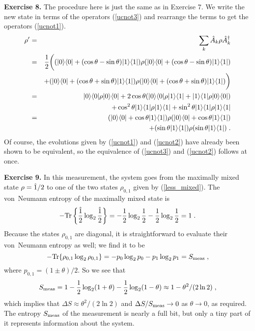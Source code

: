 {\bf Exercise 8.}  The procedure here is just the same as in Exercise 7.
We write the new state in terms of the operators (\ref{ucnot3}) and
rearrange the terms to get the operators (\ref{ucnot1}).
\begin{eqnarray}
\rho' &=& \sum_k {\hat A}_k \rho {\hat A^\dagger}_k \nonumber\\
&=& {1\over2}\biggl( ({| 0 \rangle}{\langle 0 |} + (\cos\theta-\sin\theta){| 1 \rangle}{\langle 1 |} )
  \rho ({| 0 \rangle}{\langle 0 |} + (\cos\theta-\sin\theta){| 1 \rangle}{\langle 1 |} ) \nonumber\\
&& + ({| 0 \rangle}{\langle 0 |} + (\cos\theta+\sin\theta){| 1 \rangle}{\langle 1 |} )\rho
  ({| 0 \rangle}{\langle 0 |} + (\cos\theta+\sin\theta){| 1 \rangle}{\langle 1 |}) \biggr) \nonumber\\
&=& {| 0 \rangle}{\langle 0 |}\rho{| 0 \rangle}{\langle 0 |} + 2\cos\theta({| 0 \rangle}{\langle 0 |}\rho{| 1 \rangle}{\langle 1 |}
  + {| 1 \rangle}{\langle 1 |}\rho{| 0 \rangle}{\langle 0 |} ) \nonumber\\
&& + \cos^2\theta {| 1 \rangle}{\langle 1 |}\rho{| 1 \rangle}{\langle 1 |}
  + \sin^2\theta {| 1 \rangle}{\langle 1 |}\rho{| 1 \rangle}{\langle 1 |} \nonumber\\
&=& ({| 0 \rangle}{\langle 0 |} + \cos\theta{| 1 \rangle}{\langle 1 |}) \rho
  ({| 0 \rangle}{\langle 0 |} + \cos\theta{| 1 \rangle}{\langle 1 |}) \nonumber\\
&& + (\sin\theta{| 1 \rangle}{\langle 1 |})\rho(\sin\theta{| 1 \rangle}{\langle 1 |}) \;. \nonumber
\end{eqnarray}
Of course, the evolutions given by (\ref{ucnot1}) and (\ref{ucnot2})
have already been shown to be equivalent, so the equivalence of
(\ref{ucnot3}) and (\ref{ucnot2}) follows at once.

{\bf Exercise 9.}  In this measurement, the system goes from the maximally
mixed state $\rho = {\hat 1}/2$ to one of the two states $\rho_{0,1}$ given
by (\ref{less_mixed}).  The von~Neumann entropy of the maximally mixed
state is
\[
-{\rm Tr}\left\{ {{\hat 1}\over2}\log_2{{\hat 1}\over2} \right\} =
  - {1\over2}\log_2{1\over2} - {1\over2}\log_2{1\over2} = 1 \;.
\]
Because the states $\rho_{0,1}$ are diagonal, it is straightforward to
evaluate their von~Neumann entropy as well; we find it to be
\[
-{\rm Tr}\{\rho_{0,1}\log_2\rho_{0,1}\} = - p_0 \log_2 p_0 - p_1 \log_2 p_1
  = S_{\rm meas} \;,
\]
where $p_{0,1} = (1 \pm \theta)/2$.  So we see that
\[
S_{\rm meas} = 1 - {1\over2}\log_2(1+\theta) - {1\over2}\log_2(1-\theta)
  \approx 1 - \theta^2/(2\ln2) \;,
\]
which implies that $\Delta S \approx \theta^2/(2\ln2)$ and
$\Delta S/S_{\rm meas} \rightarrow 0$ as $\theta \rightarrow 0$, as required.
The entropy $S_{\rm meas}$ of the measurement is nearly a full bit, but
only a tiny part of it represents information about the system.

